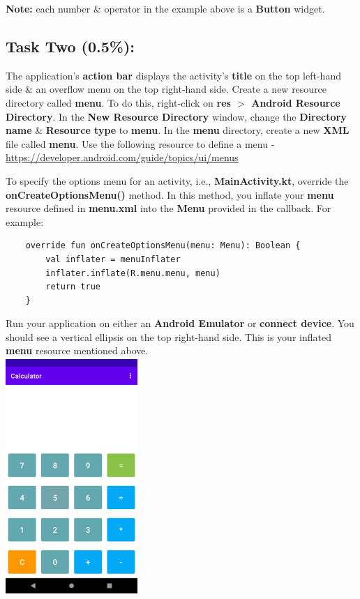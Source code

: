 \documentclass{article}
\begin{document}
\textbf{Note:} each number \& operator in the example above is a \textbf{Button} widget.

\subsection*{Task Two (0.5\%):} 
The application's \textbf{action bar} displays the activity's \textbf{title} on the top left-hand side \& an overflow menu on the top right-hand side. Create a new resource directory called \textbf{menu}. To do this, right-click on \textbf{res $>$ Android Resource Directory}. In the \textbf{New Resource Directory} window, change the \textbf{Directory name} \& \textbf{Resource type} to \textbf{menu}. In the \textbf{menu} directory, create a new \textbf{XML} file called \textbf{menu}. Use the following resource to define a menu - \href{https://developer.android.com/guide/topics/ui/menus}{https://developer.android.com/guide/topics/ui/menus}

To specify the options menu for an activity, i.e., \textbf{MainActivity.kt}, override the \textbf{onCreateOptionsMenu()} method. In this method, you inflate your \textbf{menu} resource defined in \textbf{menu.xml} into the \textbf{Menu} provided in the callback. For example:

\begin{verbatim}
    override fun onCreateOptionsMenu(menu: Menu): Boolean {
        val inflater = menuInflater
        inflater.inflate(R.menu.menu, menu)
        return true
    }
\end{verbatim}

Run your application on either an \textbf{Android Emulator} or \textbf{connect device}. You should see a vertical ellipsis on the top right-hand side. This is your inflated \textbf{menu} resource mentioned above. \\

\includegraphics[width=5cm, height=9cm]{../tex/img/practicals/02-calculator-2.png}
\end{document}
